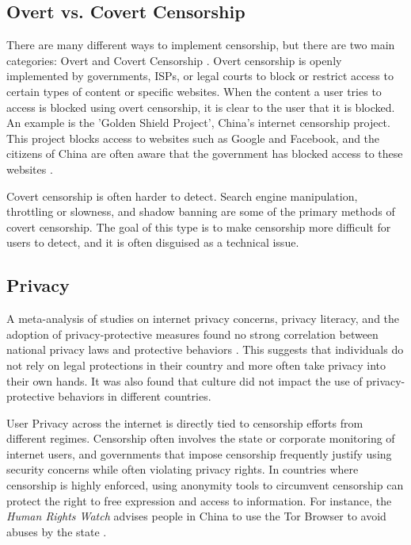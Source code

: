 \subsection{Overt vs. Covert Censorship}
\label{sec:Chris-Overt-Covert}

There are many different ways to implement censorship, but there are two main categories: Overt and Covert Censorship \cite{OvertVsCovert}. Overt censorship is openly implemented by governments, ISPs, or legal courts to block or restrict access to certain types of content or specific websites. When the content a user tries to access is blocked using overt censorship, it is clear to the user that it is blocked. An example is the 'Golden Shield Project', China's internet censorship project. This project blocks access to websites such as Google and Facebook, and the citizens of China are often aware that the government has blocked access to these websites \cite{standfordGreatFirewallOfChina}.

Covert censorship is often harder to detect. Search engine manipulation, throttling or slowness, and shadow banning are some of the primary methods of covert censorship. The goal of this type is to make censorship more difficult for users to detect, and it is often disguised as a technical issue.

\subsection{Privacy} 

A meta-analysis of studies on internet privacy concerns, privacy literacy, and the adoption of privacy-protective measures found no strong correlation between national privacy laws and protective behaviors \cite{baruh2017online}. This suggests that individuals do not rely on legal protections in their country and more often take privacy into their own hands. It was also found that culture did not impact the use of privacy-protective behaviors in different countries. 

User Privacy across the internet is directly tied to censorship efforts from different regimes. Censorship often involves the state or corporate monitoring of internet users, and governments that impose censorship frequently justify using security concerns while often violating privacy rights. In countries where censorship is highly enforced, using anonymity tools to circumvent censorship can protect the right to free expression and access to information. For instance, the \textit{Human Rights Watch} advises people in China to use the Tor Browser to avoid abuses by the state \cite{Privacy2017}.

